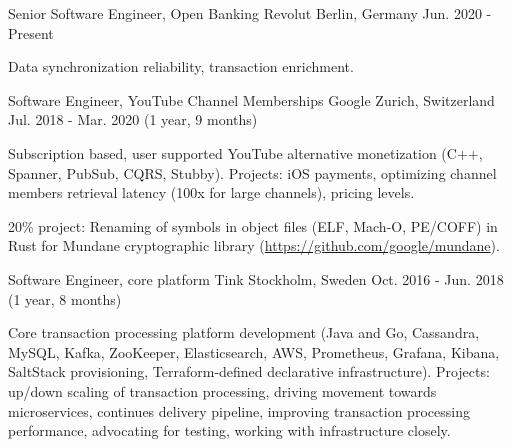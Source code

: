 

\begin{cventries}

  \cventry
    {Senior Software Engineer, Open Banking} %
    {Revolut} %
    {Berlin, Germany} %
    {Jun. 2020 - Present} %
    {
      \begin{cvitems} %
        \item {Data synchronization reliability, transaction enrichment.}
      \end{cvitems}
    }

  \cventry
    {Software Engineer, YouTube Channel Memberships} %
    {Google} %
    {Zurich, Switzerland} %
    {Jul. 2018 - Mar. 2020 (1 year, 9 months)} %
    {
      \begin{cvitems}
        \item {Subscription based, user supported YouTube alternative monetization (C++, Spanner, PubSub, CQRS, Stubby). Projects: iOS payments, optimizing channel members retrieval latency (100x for large channels), pricing levels.}
        \item {20\% project: Renaming of symbols in object files (ELF, Mach-O, PE/COFF) in Rust for Mundane cryptographic library (\url{https://github.com/google/mundane}).}
      \end{cvitems}
    }

  \cventry
    {Software Engineer, core platform} %
    {Tink} %
    {Stockholm, Sweden} %
    {Oct. 2016 - Jun. 2018 (1 year, 8 months)} %
    {
      \begin{cvitems} %
        \item {Core transaction processing platform development (Java and Go, Cassandra, MySQL, Kafka, ZooKeeper, Elasticsearch, AWS, Prometheus, Grafana, Kibana, SaltStack provisioning, Terraform-defined declarative infrastructure). Projects: up/down scaling of transaction processing, driving movement towards microservices, continues delivery pipeline, improving transaction processing performance, advocating for testing, working with infrastructure closely.}
      \end{cvitems}
    }


\end{cventries}
